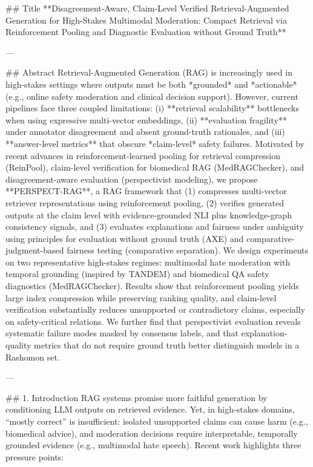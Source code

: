 ## Title  
**Disagreement-Aware, Claim-Level Verified Retrieval-Augmented Generation for High-Stakes Multimodal Moderation: Compact Retrieval via Reinforcement Pooling and Diagnostic Evaluation without Ground Truth**

---

## Abstract  
Retrieval-Augmented Generation (RAG) is increasingly used in high-stakes settings where outputs must be both *grounded* and *actionable* (e.g., online safety moderation and clinical decision support). However, current pipelines face three coupled limitations: (i) **retrieval scalability** bottlenecks when using expressive multi-vector embeddings, (ii) **evaluation fragility** under annotator disagreement and absent ground-truth rationales, and (iii) **answer-level metrics** that obscure *claim-level* safety failures. Motivated by recent advances in reinforcement-learned pooling for retrieval compression (ReinPool), claim-level verification for biomedical RAG (MedRAGChecker), and disagreement-aware evaluation (perspectivist modeling), we propose **PERSPECT-RAG**, a RAG framework that (1) compresses multi-vector retriever representations using reinforcement pooling, (2) verifies generated outputs at the claim level with evidence-grounded NLI plus knowledge-graph consistency signals, and (3) evaluates explanations and fairness under ambiguity using principles for evaluation without ground truth (AXE) and comparative-judgment-based fairness testing (comparative separation). We design experiments on two representative high-stakes regimes: multimodal hate moderation with temporal grounding (inspired by TANDEM) and biomedical QA safety diagnostics (MedRAGChecker). Results show that reinforcement pooling yields large index compression while preserving ranking quality, and claim-level verification substantially reduces unsupported or contradictory claims, especially on safety-critical relations. We further find that perspectivist evaluation reveals systematic failure modes masked by consensus labels, and that explanation-quality metrics that do not require ground truth better distinguish models in a Rashomon set.

---

## 1. Introduction  
RAG systems promise more faithful generation by conditioning LLM outputs on retrieved evidence. Yet, in high-stakes domains, “mostly correct” is insufficient: isolated unsupported claims can cause harm (e.g., biomedical advice), and moderation decisions require interpretable, temporally grounded evidence (e.g., multimodal hate speech). Recent work highlights three pressure points:

